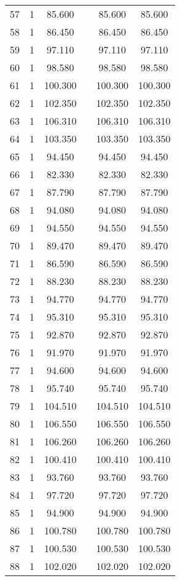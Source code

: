 \begin{table}[!htbp]
\begin{tabular}{@{\extracolsep{5pt}}lccccc}
57 & 1 & 85.600 &  & 85.600 & 85.600 \\ 
58 & 1 & 86.450 &  & 86.450 & 86.450 \\ 
59 & 1 & 97.110 &  & 97.110 & 97.110 \\ 
60 & 1 & 98.580 &  & 98.580 & 98.580 \\ 
61 & 1 & 100.300 &  & 100.300 & 100.300 \\ 
62 & 1 & 102.350 &  & 102.350 & 102.350 \\ 
63 & 1 & 106.310 &  & 106.310 & 106.310 \\ 
64 & 1 & 103.350 &  & 103.350 & 103.350 \\ 
65 & 1 & 94.450 &  & 94.450 & 94.450 \\ 
66 & 1 & 82.330 &  & 82.330 & 82.330 \\ 
67 & 1 & 87.790 &  & 87.790 & 87.790 \\ 
68 & 1 & 94.080 &  & 94.080 & 94.080 \\ 
69 & 1 & 94.550 &  & 94.550 & 94.550 \\ 
70 & 1 & 89.470 &  & 89.470 & 89.470 \\ 
71 & 1 & 86.590 &  & 86.590 & 86.590 \\ 
72 & 1 & 88.230 &  & 88.230 & 88.230 \\ 
73 & 1 & 94.770 &  & 94.770 & 94.770 \\ 
74 & 1 & 95.310 &  & 95.310 & 95.310 \\ 
75 & 1 & 92.870 &  & 92.870 & 92.870 \\ 
76 & 1 & 91.970 &  & 91.970 & 91.970 \\ 
77 & 1 & 94.600 &  & 94.600 & 94.600 \\ 
78 & 1 & 95.740 &  & 95.740 & 95.740 \\ 
79 & 1 & 104.510 &  & 104.510 & 104.510 \\ 
80 & 1 & 106.550 &  & 106.550 & 106.550 \\ 
81 & 1 & 106.260 &  & 106.260 & 106.260 \\ 
82 & 1 & 100.410 &  & 100.410 & 100.410 \\ 
83 & 1 & 93.760 &  & 93.760 & 93.760 \\ 
84 & 1 & 97.720 &  & 97.720 & 97.720 \\ 
85 & 1 & 94.900 &  & 94.900 & 94.900 \\ 
86 & 1 & 100.780 &  & 100.780 & 100.780 \\ 
87 & 1 & 100.530 &  & 100.530 & 100.530 \\ 
88 & 1 & 102.020 &  & 102.020 & 102.020 \\ 

\end{tabular}
\end{table}
